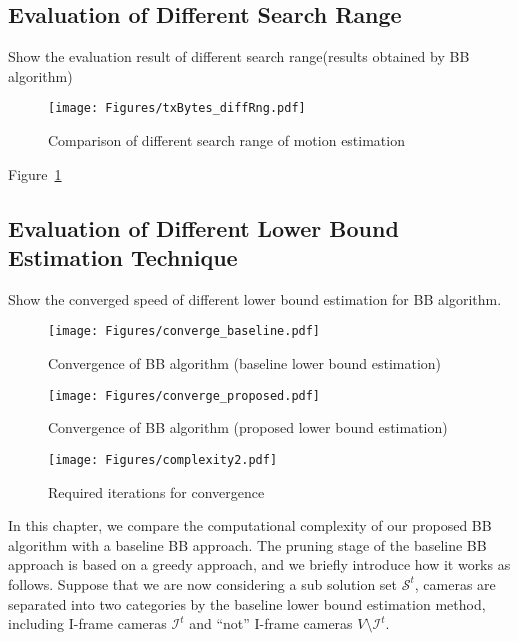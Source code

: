 \subsection{Evaluation of Different Search Range}
{\color{red}Show the evaluation result of different search range(results obtained by BB algorithm)}
%
\begin{figure}
\begin{center}
\texttt{[image: Figures/txBytes\_diffRng.pdf]}
\caption{\label{fig::txBytes_diffRng} Comparison of different search range of motion estimation}
\end{center}
\end{figure}
Figure~\ref{fig::txBytes_diffRng}

\subsection{Evaluation of Different Lower Bound Estimation Technique}
{\color{red}Show the converged speed of different lower bound estimation for BB algorithm.}
\begin{figure}
\begin{center}
\texttt{[image: Figures/converge\_baseline.pdf]}
\caption{\label{fig::converge_baseline} Convergence of BB algorithm (baseline lower bound estimation)}
\end{center}
\end{figure}
%
\begin{figure}
\begin{center}
\texttt{[image: Figures/converge\_proposed.pdf]}
\caption{\label{fig::converge_proposed} Convergence of BB algorithm (proposed lower bound estimation)}
\end{center}
\end{figure}
%
\begin{figure}
\begin{center}
\texttt{[image: Figures/complexity2.pdf]}
\caption{\label{fig::complexity} Required iterations for convergence}
\end{center}
\end{figure}
%
In this chapter, we compare the computational complexity of our proposed BB algorithm with a baseline BB approach.
The pruning stage of the baseline BB approach is based on a greedy approach, and we briefly introduce how it works as follows.
Suppose that we are now considering a sub solution set $\mathcal{S}^t$, cameras are separated into two categories by the baseline lower bound estimation method, including I-frame cameras $\mathcal{I}^t$ and ``not'' I-frame cameras $V \setminus \mathcal{I}^t$.
